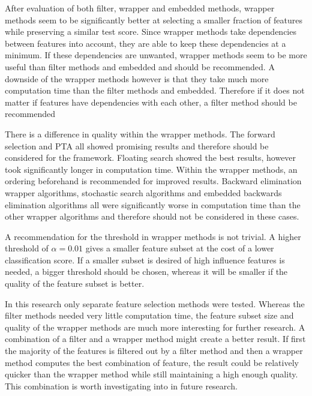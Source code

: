 \documentclass[10pt,a4paper]{article}
\begin{document}
	After evaluation of both filter, wrapper and embedded methods, wrapper methods seem to be significantly better at selecting a smaller fraction of features while preserving a similar test score. Since wrapper methods take dependencies between features into account, they are able to keep these dependencies at a minimum. If these dependencies are unwanted, wrapper methods seem to be more useful than filter methods and embedded and should be recommended. A downside of the wrapper methods however is that they take much more computation time than the filter methods and embedded. Therefore if it does not matter if features have dependencies with each other, a filter method should be recommended
	
	There is a difference in quality within the wrapper methods. The forward selection and PTA all showed promising results and therefore should be considered for the framework. Floating search showed the best results, however took significantly longer in computation time. Within the wrapper methods, an ordering beforehand is recommended for improved results. Backward elimination wrapper algorithms, stochastic search algorithms and embedded backwards elimination algorithms all were significantly worse in computation time than the other wrapper algorithms and therefore should not be considered in these cases.
	
	A recommendation for the threshold in wrapper methods is not trivial. A higher threshold of $\alpha = 0.01$ gives a smaller feature subset at the cost of a lower classification score. If a smaller subset is desired of high influence features is needed, a bigger threshold should be chosen, whereas it will be smaller if the quality of the feature subset is better.
	
	In this research only separate feature selection methods were tested. Whereas the filter methods needed very little computation time, the feature subset size and quality of the wrapper methods are much more interesting for further research. A combination of a filter and a wrapper method might create a better result. If first the majority of the features is filtered out by a filter method and then a wrapper method computes the best combination of feature, the result could be relatively quicker than the wrapper method while still maintaining a high enough quality. This combination is worth investigating into in future research.
	
\end{document}
